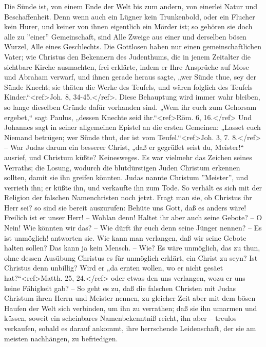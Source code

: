 Die Sünde ist, von einem Ende der Welt bis zum andern, von einerlei Natur und Beschaffenheit. Denn wenn auch ein Lügner kein Trunkenbold, oder ein Flucher kein Hurer, und keiner von ihnen eigentlich ein Mörder ist; so gehören sie doch alle zu ''einer'' Gemeinschaft, sind Alle Zweige aus einer und derselben bösen Wurzel, Alle eines Geschlechts. Die Gottlosen haben nur einen gemeinschaftlichen Vater; wie Christus den Bekennern des Judenthums, die in jenem Zeitalter die sichtbare Kirche ausmachten, frei erklärte, indem er Ihre Ansprüche auf Mose und Abraham verwarf, und ihnen gerade heraus sagte, „wer Sünde thue, sey der Sünde Knecht; sie thäten die Werke des Teufels, und wären folglich des Teufels Kinder.“<ref>Joh. 8, 34-45.</ref>. Diese Behauptung wird immer wahr bleiben, so lange dieselben Gründe dafür vorhanden sind. „Wem ihr euch zum Gehorsam ergebet,“ sagt Paulus, „dessen Knechte seid ihr.“<ref>Röm. 6, 16.</ref> Und Johannes sagt in seiner allgemeinen Epistel an die ersten Gemeinen: „Lasset euch Niemand betrügen; wer Sünde thut, der ist vom Teufel.“<ref>Joh. 3, 7. 8.</ref> – War Judas darum ein besserer Christ, „daß er gegrüßet seist du, Meister!“ ausrief, und Christum küßte? Keinesweges. Es war vielmehr das Zeichen seines Verraths; die Losung, wodurch die blutdürstigen Juden Christum erkennen sollten, damit sie ihn greifen könnten. Judas nannte Christum ''Meister'', und verrieth ihn; er küßte ihn, und verkaufte ihn zum Tode. So verhält es sich mit der Religion der falschen Namenchristen noch jetzt. Fragt man sie, ob Christus ihr Herr sei? so sind sie bereit auszurufen: Behüte uns Gott, daß es anders wäre! Freilich ist er unser Herr! – Wohlan denn! Haltet ihr aber auch seine Gebote? – O Nein! Wie könnten wir das? – Wie dürft ihr euch denn seine Jünger nennen? – Es ist unmöglich! antworten sie. Wie kann man verlangen, daß wir seine Gebote halten sollen? Das kann ja kein Mensch. – Wie? Es wäre unmöglich, das zu thun, ohne dessen Ausübung Christus es für unmöglich erklärt, ein Christ zu seyn? Ist Christus denn unbillig? Wird er „da ernten wollen, wo er nicht gesäet hat?“<ref>Matth. 25, 24.</ref> oder etwas den uns verlangen, wozu er uns keine Fähigkeit gab? – So geht es zu, daß die falschen Christen mit Judas Christum ihren Herrn und Meister nennen, zu gleicher Zeit aber mit dem bösen Haufen der Welt sich verbinden, um ihn zu verrathen; daß sie ihn umarmen und küssen, soweit ein scheinbares Namenbekenntniß reicht, ihn aber – treulos verkaufen, sobald es darauf ankommt, ihre herrschende Leidenschaft, der sie am meisten nachhängen, zu befriedigen. 

